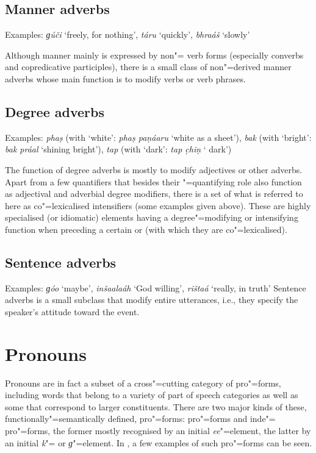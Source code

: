 \subsection{Manner adverbs}
\label{subsec:3b-5-3}
Examples: \textit{ɡúči} `freely, for nothing', \textit{táru} `quickly', \textit{bhraáš} `slowly'


Although manner mainly is expressed by non"= verb forms (especially converbs and copredicative participles), there is a small class of non"=derived manner adverbs whose main function is to modify verbs or verb phrases.


\subsection{Degree adverbs}
\label{subsec:3b-5-4}
Examples: \textit{phaṣ} (with `white': \textit{phaṣ paṇáaru} `white as a sheet'), \textit{bak} (with `bright': \textit{bak práal} `shining bright'), \textit{tap} (with `dark': \textit{tap c̣hiṇ} ` dark')


The function of degree adverbs is mostly to modify adjectives or other adverbs. Apart from a few quantifiers that besides their "=quantifying role also function as adjectival and adverbial degree modifiers, there is a set of what is referred to here as co"=lexicalised intensifiers (some examples given above). These are highly specialised (or idiomatic) elements having a degree"=modifying or intensifying function when preceding a certain  or  (with which they are co"=lexicalised). 


\subsection{Sentence adverbs}
\label{subsec:3b-5-5}
Examples: \textit{ɡóo} `maybe', \textit{inšaalaáh} `God willing', \textit{rištaá} `really, in truth'
Sentence adverbs is a small subclass that modify entire utterances, i.e., they specify the speaker’s attitude toward the event.


\section{Pronouns}
\label{sec:3b-6}
Pronouns are in fact a subset of a cross"=cutting category of pro"=forms, including words that belong to a variety of part of speech categories as well as some that correspond to larger constituents. There are two major kinds of these, functionally"=semantically defined, pro"=forms:  pro"=forms and inde"= pro"=forms, the former mostly recognised by an initial \textit{ee}"=element, the latter by an initial \textit{k}"= or \textit{ɡ}"=element. In , a few examples of such pro"=forms can be seen.


